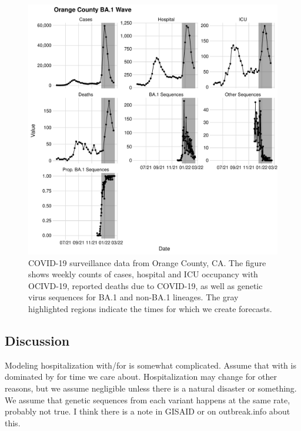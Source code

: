 \begin{figure}
    \centering
    \includegraphics[width=1.0\columnwidth]{orange_county_binned_data_plot.pdf}
    \caption[COVID-19 surveillance data from Orange County, California.]{
COVID-19 surveillance data from Orange County, CA.
The figure shows weekly counts of cases, hospital and ICU occupancy with OCIVD-19, reported deaths due to COVID-19, as well as genetic virus sequences for BA.1 and non-BA.1 lineages.
The gray highlighted regions indicate the times for which we create forecasts.}
    \label{ch_5:fig:orange_county_binned_data_plot}
\end{figure}

\subsection{Discussion}
\label{ch_5:subsec:discussion}
Modeling hospitalization with/for is somewhat complicated.
Assume that with is dominated by for time we care about.
Hospitalization may change for other reasons, but we assume negligible unless there is a natural disaster or something.
We assume that genetic sequences from each variant happens at the same rate, probably not true.
I think there is a note in GISAID or on outbreak.info about this.